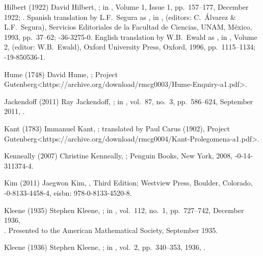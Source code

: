 \biblabel Hilbert (1922)
David Hilbert,
;
in ,
Volume 1, Issue 1, pp.~157--177, December 1922;
.
Spanish translation by L.F.\ Segura as
,
in ,
 (editors: C.\ Álvarez \& L.F.\ Segura),
Servicios Editoriales de la Facultad de Ciencias, UNAM,
México, 1993, pp.~37--62;
-36-3275-0.
English translation by W.B.\ Ewald as
,
in , Volume 2,
 (editor: W.B.\ Ewald),
Oxford University Press, Oxford, 1996, pp.~1115--1134;
-19-850536-1.

\biblabel Hume (1748)
David Hume,
;
\URL Project Gutenberg<https://archive.org/download/rmcg0003/Hume-Enquiry-a1.pdf>.

\biblabel Jackendoff (2011)
Ray Jackendoff,
;
in ,
vol.\ 87, no.\ 3, pp.\ 586--624, September 2011,
.

\biblabel Kant (1783)
Immanuel Kant,
;
translated by Paul Carus (1902),
\URL Project Gutenberg<https://archive.org/download/rmcg0004/Kant-Prolegomena-a1.pdf>.

\biblabel Kenneally (2007)
Christine Kenneally,
;
Penguin Books, New York, 2008,
-0-14-311374-4.

\biblabel Kim (2011)
Jaegwon Kim,
, Third Edition;
Westview Press, Boulder, Colorado,
-0-8133-4458-4,
e{\sc isbn}: 978-0-8133-4520-8.

\biblabel Kleene (1935)
Stephen Kleene,
;
in ,
vol.\ 112, no.\ 1, pp.\ 727--742, December 1936,\\
.
Presented to the American Mathematical Society,
September 1935.

\biblabel Kleene (1936)
Stephen Kleene,
;
in ,
vol.\ 2, pp.\ 340--353, 1936,
.


